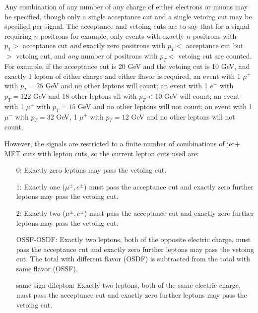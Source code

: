 \documentclass[10pt]{article}
\begin{document}
Any combination of any number of any charge of either electrons or muons may be
 specified, though only a single acceptance cut and a single vetoing cut may be
 specified per signal. The acceptance and vetoing cuts are to say that for a
 signal requiring $n$ positrons for example, only events with exactly
 $n$ positrons with $p_{T} >$ acceptance cut {\em{and}} exactly zero positrons
 with $p_{T} <$ acceptance cut but $>$ vetoing cut, and {\em{any}} number of
 positrons with $p_{T} <$ vetoing cut are counted. For example, if the
 acceptance cut is 20 GeV and the vetoing cut is 10 GeV, and exactly 1 lepton
 of either charge and either flavor is required, an event with 1 ${\mu}^{+}$
 with $p_{T} = 25$ GeV and no other leptons will count; an event with 1 $e^{-}$
 with $p_{T} = 122$ GeV and 18 other leptons all with $p_{T} < 10$ GeV will
 count; an event with 1 ${\mu}^{+}$ with $p_{T} = 15$ GeV and no other leptons
 will not count; an event with 1 ${\mu}^{-}$ with $p_{T} = 32$ GeV,
 1 ${\mu}^{+}$ with $p_{T} = 12$ GeV and no other leptons will not count.

However, the signals are restricted to a finite number of combinations of
 jet$+$MET cuts with lepton cuts, so the current lepton cuts used are:
\begin{itemize}

\item[0:] Exactly zero leptons may pass the vetoing cut.

\item[1:] Exactly one (${\mu}^{\pm}, e^{\pm}$) must pass the acceptance cut
          and exactly zero further leptons may pass the vetoing cut.

\item[2:] Exactly two (${\mu}^{\pm}, e^{\pm}$) must pass the acceptance cut
          and exactly zero further leptons may pass the vetoing cut.

\item[OSSF-OSDF:] Exactly two leptons, both of the opposite electric
                  charge, must pass the acceptance cut and exactly zero further
                  leptons may pass the vetoing cut. The total with different
                  flavor (OSDF) is subtracted from the total with same flavor
                  (OSSF).

\item[same-sign dilepton:] Exactly two leptons, both of the same electric
                           charge, must pass the acceptance cut and exactly zero
                           further leptons may pass the vetoing cut.

\end{itemize}
\end{document}
